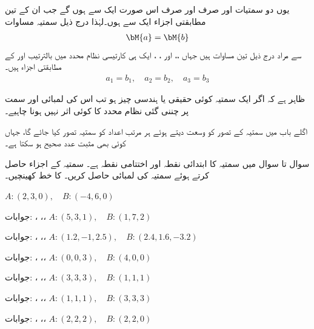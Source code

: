 یوں دو سمتیات  اور  صرف اور صرف اس صورت ایک سے ہوں گے جب ان کے تین مطابقتی اجزاء ایک سے  ہوں۔لہٰذا درج ذیل سمتیہ  مساوات
\begin{align*}
\bM{a}=\bM{b}
\end{align*}
سے مراد درج ذیل تین مساوات ہیں جہاں ،، اور ، ،  ایک ہی کارتیسی نظام محدد میں بالترتیب  اور  کے مطابقتی اجزاء ہیں۔
\begin{align*}
a_1=b_1,\quad a_2=b_2,\quad a_3=b_3
\end{align*}

ظاہر ہے کہ اگر ایک سمتیہ کوئی حقیقی یا ہندسی چیز ہو تب اس کی لمبائی اور سمت پر چننی گئی نظام محدد کا کوئی اثر نہیں ہونا چاہیے۔ 

اگلے باب میں سمتیہ کے تصور کو وسعت دیتے ہوئے ہر مرتب  اعداد کو سمتیہ تصور کیا جائے گا، جہاں   کوئی بھی مثبت عدد صحیح ہو سکتا ہے۔

سوال  تا سوال  میں سمتیہ  کا ابتدائی نقطہ  اور اختتامی نقطہ  ہے۔ سمتیہ  کے اجزاء حاصل کرتے ہوئے سمتیہ کی لمبائی  حاصل کریں۔ کا خط کھینچیں۔

\quad
$A:(2,3,0), \quad B:(-4,6,0)$

جوابات: ،  ،، 
\quad
$A:(5,3,1), \quad B:(1,7,2)$

جوابات: ،  ،، 
\quad
$A:(1.2,-1,2.5), \quad B:(2.4,1.6,-3.2)$

جوابات: ،  ،، 
\quad
$A:(0,0,3), \quad B:(4,0,0)$

جوابات: ،  ،، 
\quad
$A:(3,3,3), \quad B:(1,1,1)$

جوابات: ،  ،، 
\quad
$A:(1,1,1), \quad B:(3,3,3)$

جوابات: ،  ،، 
\quad
$A:(2,2,2), \quad B:(2,2,0)$

